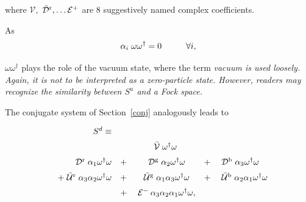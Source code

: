 \documentclass[letterpaper,12pt,titlepage,oneside,final]{book}
\newcommand{\oot}{\omega \omega^{\dagger}}
\newcommand{\oto}{\omega ^{\dagger}\omega }
\newcommand{\spacer}{0.2cm}
\begin{document}
\noindent where $\mathcal{V},$  $\bar{\mathcal{D}}^{\textup{r}}, \dots \mathcal{E}^{+} $ are 8 suggestively named complex coefficients.  

As 
\begin{equation} \alpha_i\hspace{1mm}\oot = 0 \hspace{1cm} \forall i,
\end{equation}

\noindent $\oot$ plays the role of the vacuum state, where the term \it vacuum \rm is used loosely.  Again, it is not to be interpreted as a zero-particle state.  However, readers may recognize the similarity between $S^u$ and a Fock space.

The conjugate system of Section~\ref{conj} analogously leads to

\begin{equation}\begin{array}{lrlcll}  \label{sd}
&S^{d} \equiv&&&& \vspace{\spacer}\\

 & & &\bar{\mathcal{V}}  \hspace{1mm} \oto   & & \vspace{\spacer}\\

   &   \hspace{1mm}\mathcal{D}^{\textup{r}} \hspace{1mm}  \alpha_{1}\oto    & + &   \hspace{1mm}\mathcal{D}^{\textup{g}}  \hspace{1mm} \alpha_{2}\oto    & + & \hspace{1mm}\mathcal{D}^{\textup{b}}  \hspace{1mm} \alpha_{3}\oto   \vspace{\spacer}\\

    & +\hspace{1mm}\bar{\mathcal{U}}^{\textup{r}} \hspace{1mm}  \alpha_{3}\alpha_{2} \oto  & + & 
\hspace{1mm}\bar{\mathcal{U}}^{\textup{g}} \hspace{1mm}  \alpha_{1}\alpha_{3} \oto  & + &  \hspace{1mm}\bar{\mathcal{U}}^{\textup{b}} \hspace{1mm}  \alpha_{2}\alpha_{1} \oto \vspace{\spacer} \\

  & & +&\hspace{1mm}\mathcal{E}^{-}  \hspace{.7mm} \alpha_3\alpha_{2}\alpha_{1} \oto,  & &
\end{array}\end{equation}
\end{document}
